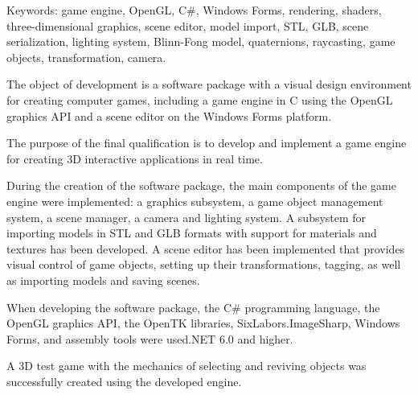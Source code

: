 Keywords: game engine, OpenGL, C\#, Windows Forms, rendering, shaders, three-dimensional graphics, scene editor, model import, STL, GLB, scene serialization, lighting system, Blinn-Fong model, quaternions, raycasting, game objects, transformation, camera.

The object of development is a software package with a visual design environment for creating computer games, including a game engine in C using the OpenGL graphics API and a scene editor on the Windows Forms platform.

The purpose of the final qualification is to develop and implement a game engine for creating 3D interactive applications in real time.

During the creation of the software package, the main components of the game engine were implemented: a graphics subsystem, a game object management system, a scene manager, a camera and lighting system. A subsystem for importing models in STL and GLB formats with support for materials and textures has been developed. A scene editor has been implemented that provides visual control of game objects, setting up their transformations, tagging, as well as importing models and saving scenes.

When developing the software package, the C\# programming language, the OpenGL graphics API, the OpenTK libraries, SixLabors.ImageSharp, Windows Forms, and assembly tools were used.NET 6.0 and higher.

A 3D test game with the mechanics of selecting and reviving objects was successfully created using the developed engine.
